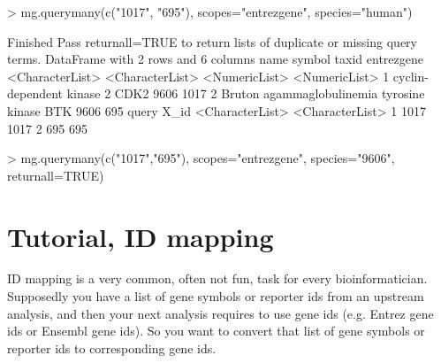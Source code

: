 \documentclass[12pt]{article}
\begin{document}
\begin{Schunk}
\begin{Sinput}
> mg.querymany(c("1017", "695"), scopes="entrezgene", species="human")
\end{Sinput}
\begin{Soutput}
Finished
Pass returnall=TRUE to return lists of duplicate or missing query terms.
DataFrame with 2 rows and 6 columns
                                       name          symbol         taxid    entrezgene
                            <CharacterList> <CharacterList> <NumericList> <NumericList>
1                 cyclin-dependent kinase 2            CDK2          9606          1017
2 Bruton agammaglobulinemia tyrosine kinase             BTK          9606           695
            query            X_id
  <CharacterList> <CharacterList>
1            1017            1017
2             695             695
\end{Soutput}
\end{Schunk}




\begin{Schunk}
\begin{Sinput}
> mg.querymany(c("1017","695"), scopes="entrezgene", species="9606", returnall=TRUE)
\end{Sinput}
\end{Schunk}



   
\section{Tutorial, ID mapping}


ID mapping is a very common, often not fun, task for every bioinformatician. Supposedly you have a list of gene symbols or reporter ids from an upstream analysis, and then your next analysis requires to use gene ids (e.g. Entrez gene ids or Ensembl gene ids). So you want to convert that list of gene symbols or reporter ids to corresponding gene ids.
\end{document}
